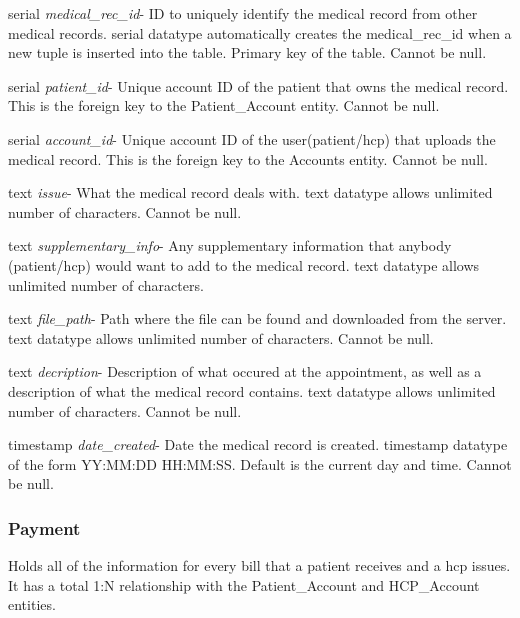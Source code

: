 \begin{description}
\item serial \textit{medical\_rec\_id}- ID to uniquely identify the medical record from other medical records. serial datatype automatically creates the medical\_rec\_id when a new tuple is inserted into the table.  Primary key of the table.  Cannot be null.
\item serial \textit{patient\_id}- Unique account ID of the patient that owns the medical record.  This is the foreign key to the Patient\_Account entity.  Cannot be null.
\item serial \textit{account\_id}- Unique account ID of the user(patient/hcp) that uploads the medical record.  This is the foreign key to the Accounts entity.  Cannot be null.
\item text \textit{issue}-  What the medical record deals with.  text datatype allows unlimited number of characters.  Cannot be null.
\item text \textit{supplementary\_info}- Any supplementary information that anybody (patient/hcp) would want to add to the medical record.  text datatype allows unlimited number of characters.
\item text \textit{file\_path}- Path where the file can be found and downloaded from the server.  text datatype allows unlimited number of characters.  Cannot be null.
\item text \textit{decription}- Description of what occured at the appointment, as well as a description of what the medical record contains.  text datatype allows unlimited number of characters.  Cannot be null.
\item timestamp \textit{date\_created}- Date the medical record is created.  timestamp datatype of the form YY:MM:DD HH:MM:SS.  Default is the current day and time.  Cannot be null.
\end{description}

\subsubsection{Payment}
Holds all of the information for every bill that a patient receives and a hcp issues.  It has a total 1:N relationship with the Patient\_Account and HCP\_Account entities.

